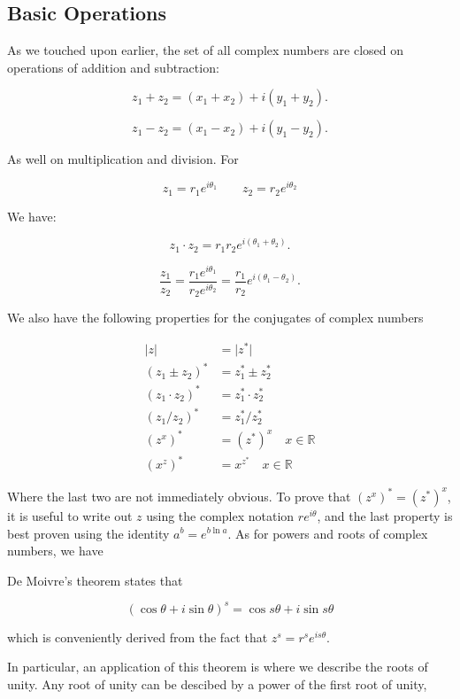 \documentclass[12pt]{article}
\begin{document}
\subsection{Basic Operations}

As we touched upon earlier, the set of all complex numbers are closed on operations of addition and subtraction:

$$z_1+z_2=(x_1+x_2)+i(y_1+y_2).$$

$$z_1-z_2=(x_1-x_2)+i(y_1-y_2).$$

As well on multiplication and division. For 

$$z_1=r_1 e^{i\theta_1} \qquad z_2=r_2 e^{i\theta_2}$$ 

We have:

$$z_1\cdot z_2=r_1 r_2 e^{i(\theta_1+\theta_2)}.$$

$$\displaystyle \frac{z_1}{z_2}=\frac{r_1 e^{i\theta_1}}{r_2 e^{i\theta_2}}=\frac{r_1}{r_2}e^{i(\theta_1-\theta_2)}.$$

We also have the following properties for the conjugates of complex numbers

\begin{align*}
    \vert z \vert &= \vert z^* \vert \\
    (z_1 \pm z_2)^* &= z_1^* \pm z_2^* \\
    (z_1 \cdot z_2)^* &= z_1^* \cdot z_2^* \\
    (z_1 / z_2)^* &= z_1^* / z_2^* \\
    (z^x)^* &= (z^*)^x \quad x \in \mathbb{R}\\
    (x^z)^* &= x^{z^*} \quad x \in \mathbb{R}
\end{align*}

Where the last two are not immediately obvious. To prove that $(z^x)^* = (z^*)^x$, it is useful to write out $z$ using the complex notation $r e^{i\theta}$, and the last property is best proven using the identity $a^b = e^{b \ln a}$. As for powers and roots of complex numbers, we have 

\begin{theorem}
    De Moivre's theorem states that

    $$(\cos \theta + i \sin \theta)^s = \cos{s \theta} + i \sin{s \theta}$$

    which is conveniently derived from the fact that $z^s = r^s e^{is\theta}$.
\end{theorem}

In particular, an application of this theorem is where we describe the roots of unity. Any root of unity can be descibed by a power of the first root of unity, 
\end{document}
